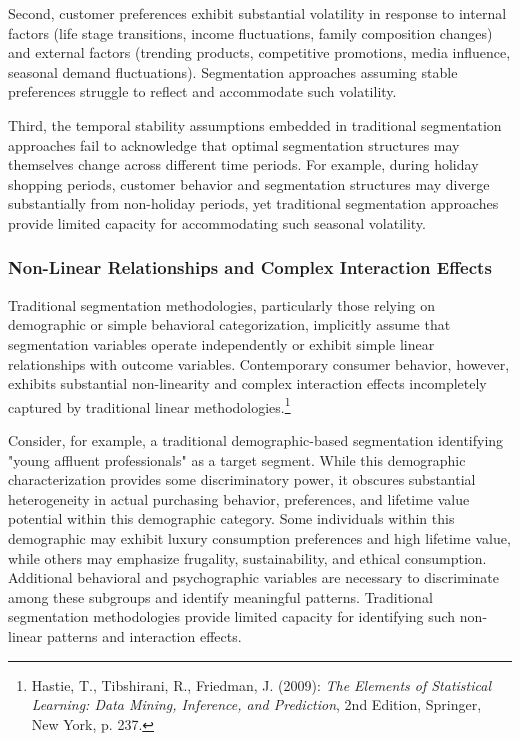 \documentclass[12pt,a4paper,oneside]{report}
\begin{document}
Second, customer preferences exhibit substantial volatility in response to internal factors (life stage transitions, income fluctuations, family composition changes) and external factors (trending products, competitive promotions, media influence, seasonal demand fluctuations). Segmentation approaches assuming stable preferences struggle to reflect and accommodate such volatility.

Third, the temporal stability assumptions embedded in traditional segmentation approaches fail to acknowledge that optimal segmentation structures may themselves change across different time periods. For example, during holiday shopping periods, customer behavior and segmentation structures may diverge substantially from non-holiday periods, yet traditional segmentation approaches provide limited capacity for accommodating such seasonal volatility.

\subsubsection{Non-Linear Relationships and Complex Interaction Effects}

Traditional segmentation methodologies, particularly those relying on demographic or simple behavioral categorization, implicitly assume that segmentation variables operate independently or exhibit simple linear relationships with outcome variables. Contemporary consumer behavior, however, exhibits substantial non-linearity and complex interaction effects incompletely captured by traditional linear methodologies.\footnote{Hastie, T., Tibshirani, R., Friedman, J. (2009): \textit{The Elements of Statistical Learning: Data Mining, Inference, and Prediction}, 2nd Edition, Springer, New York, p. 237.}

Consider, for example, a traditional demographic-based segmentation identifying "young affluent professionals" as a target segment. While this demographic characterization provides some discriminatory power, it obscures substantial heterogeneity in actual purchasing behavior, preferences, and lifetime value potential within this demographic category. Some individuals within this demographic may exhibit luxury consumption preferences and high lifetime value, while others may emphasize frugality, sustainability, and ethical consumption. Additional behavioral and psychographic variables are necessary to discriminate among these subgroups and identify meaningful patterns. Traditional segmentation methodologies provide limited capacity for identifying such non-linear patterns and interaction effects.
\end{document}
